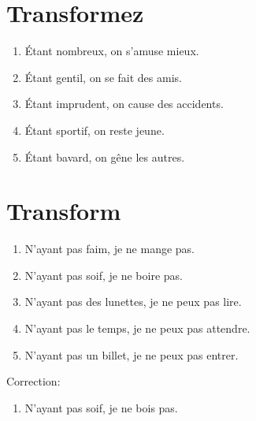 \documentclass{book}
\begin{document}
    \section{Transformez}
        \begin{enumerate}
            \item Étant nombreux, on s'amuse mieux.
            \item Étant gentil, on se fait des amis.
            \item Étant imprudent, on cause des accidents.
            \item Étant sportif, on reste jeune.
            \item Étant bavard, on gêne les autres.
        \end{enumerate}

    \section{Transform}
        \begin{enumerate}
            \item N'ayant pas faim, je ne mange pas.
            \item N'ayant pas soif, je ne boire pas.
            \item N'ayant pas des lunettes, je ne peux pas lire.
            \item N'ayant pas le temps, je ne peux pas attendre.
            \item N'ayant pas un billet, je ne peux pas entrer.
        \end{enumerate}
        Correction:
        \begin{enumerate}
            \item N'ayant pas soif, je ne bois pas.
        \end{enumerate}
\end{document}
